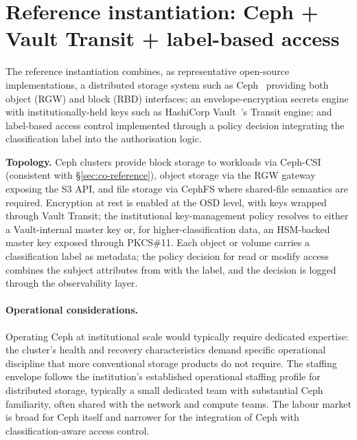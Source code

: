 \section{Reference instantiation: Ceph + Vault Transit + label-based access}
\label{sec:st-reference}

The reference instantiation combines, as representative open-source
implementations, a distributed storage system such as
Ceph~\cite{ceph} providing both object (RGW) and block (RBD)
interfaces; an envelope-encryption secrets engine with
institutionally-held keys such as HashiCorp Vault~\cite{vault}'s
Transit engine; and label-based access
control implemented through a policy decision integrating the
classification label into the authorisation logic.

\begin{instantiationbox}
\noindent\textbf{Topology.} Ceph clusters provide block storage to
 workloads via Ceph-CSI (consistent with
\S\ref{sec:co-reference}), object storage via the RGW gateway
exposing the S3 API, and file storage via CephFS where shared-file
semantics are required. Encryption at rest is enabled at the OSD
level, with keys wrapped through Vault Transit; the institutional
key-management policy resolves to either a Vault-internal master
key or, for higher-classification data, an HSM-backed master key
exposed through PKCS\#11. Each object or volume carries a
classification label as metadata; the policy decision for read or
modify access combines the subject attributes from
 with the label, and the decision is logged
through the observability layer.
\end{instantiationbox}

\paragraph{Operational considerations.} Operating Ceph at
institutional scale would typically require dedicated expertise:
the cluster's health and recovery characteristics demand specific
operational discipline that more conventional storage products do
not require. The staffing envelope follows the institution's
established operational staffing profile for distributed storage,
typically a small dedicated team with substantial Ceph familiarity,
often shared with the network and compute teams. The labour market
is broad for Ceph itself and narrower for the integration of Ceph
with classification-aware access control.

